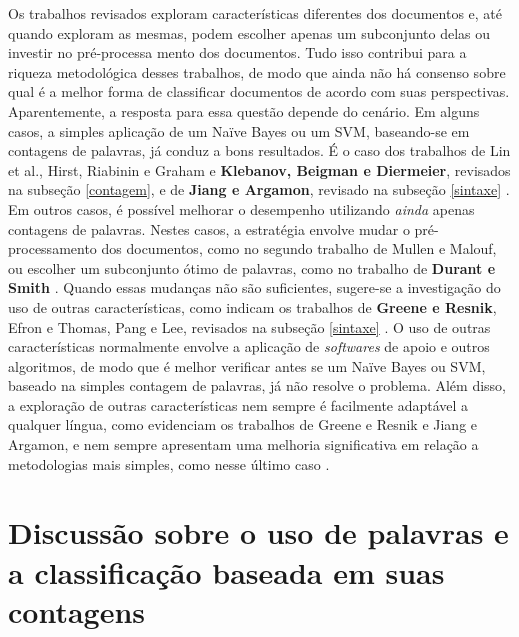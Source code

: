 Os trabalhos revisados exploram características diferentes dos documentos e, até quando exploram as mesmas, podem escolher apenas um subconjunto delas ou investir no pré-processa mento dos documentos. Tudo isso contribui para a riqueza metodológica desses trabalhos, de modo que ainda não há consenso sobre qual é a melhor forma de classificar documentos de acordo com suas perspectivas. Aparentemente, a resposta para essa questão depende do cenário. Em alguns casos, a simples aplicação de um Naïve Bayes ou um SVM, baseando-se em contagens de palavras, já conduz a bons resultados. É o caso dos trabalhos de Lin et al., Hirst, Riabinin e Graham e \textbf{Klebanov, Beigman e Diermeier}, revisados na subseção \ref{contagem}, e de \textbf{Jiang e Argamon}, revisado na subseção \ref{sintaxe} \cite{lin-et-al2006} \cite{hirst-et-al} \cite{klebanov} \cite{jiang-argamon}. Em outros casos, é possível melhorar o desempenho utilizando \emph{ainda} apenas contagens de palavras. Nestes casos, a estratégia envolve mudar o pré-processamento dos documentos, como no segundo trabalho de Mullen e Malouf, ou escolher um subconjunto ótimo de palavras, como no trabalho de \textbf{Durant e Smith} \cite{malouf-taking_sides} \cite{durant-smith}. Quando essas mudanças não são suficientes, sugere-se a investigação do uso de outras características, como indicam os trabalhos de \textbf{Greene e Resnik}, Efron e Thomas, Pang e Lee, revisados na subseção \ref{sintaxe} \cite{greene} \cite{efron} \cite{get-out-the-vote}. O uso de outras características normalmente envolve a aplicação de \emph{softwares} de apoio e outros algoritmos, de modo que é melhor verificar antes se um Naïve Bayes ou SVM, baseado na simples contagem de palavras, já não resolve o problema. Além disso, a exploração de outras características nem sempre é facilmente adaptável a qualquer língua, como evidenciam os trabalhos de Greene e Resnik e Jiang e Argamon, e nem sempre apresentam uma melhoria significativa em relação a metodologias mais simples, como nesse último caso \cite{greene} \cite{jiang-argamon}.
 
\section{Discussão sobre o uso de palavras e a classificação baseada em suas contagens}
\label{freqs:experim}

